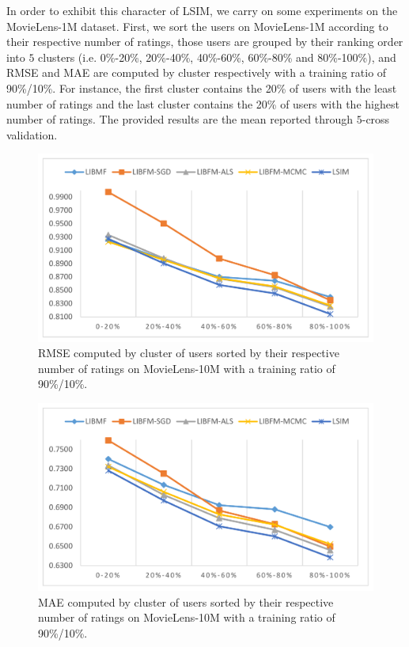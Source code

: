 \documentclass{llncs}
\begin{document}
In order to exhibit this character of LSIM,
we carry on some experiments on the MovieLens-1M dataset.
First, we sort the users on MovieLens-1M according to their respective number
of ratings, those users are grouped by their ranking order into $5$  
clusters (i.e. 0\%-20\%, 20\%-40\%, 40\%-60\%, 60\%-80\% and 80\%-100\%),
and RMSE and MAE are computed by cluster respectively with a training ratio of 90\%/10\%.
For instance, the first cluster contains the 20\% of users with the least
number of ratings and the last cluster contains the 20\% of users with the
highest number of ratings.
The provided results are the mean reported through $5$-cross validation.

\begin{figure}[htbp]
	\centering
	\includegraphics[scale=0.3]{images/rank_rmse.pdf}
	\caption{RMSE computed by cluster of users sorted by their respective number
		of ratings on MovieLens-10M with a training ratio of 90\%/10\%.}
	\label{fig:rank_rsme}
\end{figure}

\begin{figure}[htbp]
	\centering
	\includegraphics[scale=0.3]{images/rank_mae.pdf}
	\caption{MAE computed by cluster of users sorted by their respective number
		of ratings on MovieLens-10M with a training ratio of 90\%/10\%.}
	\label{fig:rank_mae}
\end{figure}
\end{document}
